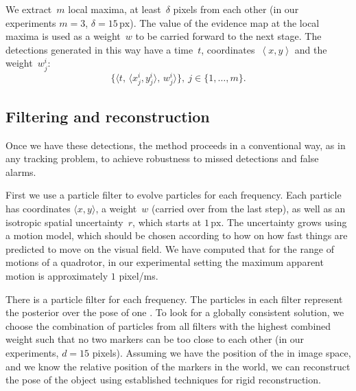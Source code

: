We extract~$m$ local maxima, at least~$\delta$ pixels from each
other (in our experiments $m=3$, $\delta=15\,\mbox{px}$). The value
of the evidence map at the local maxima is used as a weight~$w$
to be carried forward to the next stage. The detections generated
in this way have a time~$t$, coordinates~$\left\langle x,y\right\rangle $
and the weight~$w_{j}^{i}$:
\[
\{\langle t,\,\langle x_{j}^{i},y_{j}^{i}\rangle,\, w_{j}^{i}\rangle\},\ j\in\{1,\dots,m\}.
\]



\subsection{Filtering and reconstruction}

Once we have these detections, the method proceeds in a conventional
way, as in any tracking problem, to achieve robustness to missed detections
and false alarms. 

First we use a particle filter to evolve particles for each frequency.
Each particle has coordinates $\langle x,y\rangle$, a weight~$w$
(carried over from the last step), as well as an isotropic spatial
uncertainty~$r$, which starts at $1\,\mbox{px}$. The uncertainty
grows using a motion model, which should be chosen according to how
on how fast things are predicted to move on the visual field. We have
computed that for the range of motions of a quadrotor, in our experimental
setting the maximum apparent motion is approximately $1$ pixel/ms.

There is a particle filter for each frequency. The particles in each
filter represent the posterior over the pose of one \ALM. To look
for a globally consistent solution, we choose the combination of particles
from all filters with the highest combined weight such that no two
markers can be too close to each other (in our experiments, $d=15$
pixels). Assuming we have the position of the \ALMs in image space,
and we know the relative position of the markers in the world, we
can reconstruct the pose of the object using established techniques
for rigid reconstruction.
